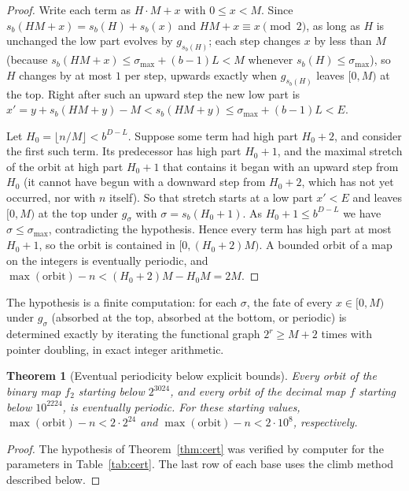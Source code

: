\documentclass[11pt]{article}
\newtheorem{theorem}{Theorem}[section]
\theoremstyle{definition}
\theoremstyle{remark}
\begin{document}
\begin{proof}
Write each term as $H\cdot M+x$ with $0\le x<M$. Since $s_b(HM+x)=s_b(H)+s_b(x)$
and $HM+x\equiv x\pmod2$, as long as $H$ is unchanged the low part evolves by
$g_{s_b(H)}$; each step changes $x$ by less than $M$ (because
$s_b(HM+x)\le\sigma_{\max}+(b-1)L<M$ whenever $s_b(H)\le\sigma_{\max}$), so $H$
changes by at most $1$ per step, upwards exactly when $g_{s_b(H)}$ leaves
$[0,M)$ at the top. Right after such an upward step the new low part is
$x'=y+s_b(HM+y)-M<s_b(HM+y)\le\sigma_{\max}+(b-1)L<E$.

Let $H_0=\lfloor n/M\rfloor<b^{D-L}$. Suppose some term had high part
$H_0+2$, and consider the first such term. Its predecessor has high part
$H_0+1$, and the maximal stretch of the orbit at high part $H_0+1$ that
contains it began with an upward step from $H_0$ (it cannot have begun with
a downward step from $H_0+2$, which has not yet occurred, nor with $n$
itself). So that stretch starts at a low part $x'<E$ and leaves $[0,M)$ at the
top under $g_\sigma$ with $\sigma=s_b(H_0+1)$. As $H_0+1\le b^{D-L}$ we have
$\sigma\le\sigma_{\max}$, contradicting the hypothesis. Hence every term has
high part at most $H_0+1$, so the orbit is contained in $[0,(H_0+2)M)$. A
bounded orbit of a map on the integers is eventually periodic, and
$\max(\text{orbit})-n<(H_0+2)M-H_0M=2M$.
\end{proof}

The hypothesis is a finite computation: for each $\sigma$, the fate of every
$x\in[0,M)$ under $g_\sigma$ (absorbed at the top, absorbed at the bottom, or
periodic) is determined exactly by iterating the functional graph $2^r\ge M+2$
times with pointer doubling, in exact integer arithmetic.

\begin{theorem}[Eventual periodicity below explicit bounds]\label{thm:certres}
Every orbit of the binary map $f_2$ starting below $2^{3024}$, and every orbit
of the decimal map $f$ starting below $10^{2224}$, is eventually periodic. For
these starting values, $\max(\text{orbit})-n<2\cdot2^{24}$ and
$\max(\text{orbit})-n<2\cdot10^{8}$, respectively.
\end{theorem}

\begin{proof}
The hypothesis of Theorem~\ref{thm:cert} was verified by computer for the
parameters in Table~\ref{tab:cert}. The last row of each base uses the climb
method described below.
\end{proof}
\end{document}
